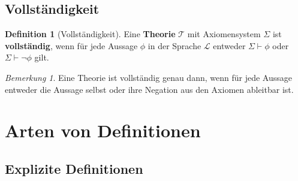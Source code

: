 \documentclass{book}
\theoremstyle{plain}
\theoremstyle{remark}
\newtheorem*{remark}{Bemerkung}
\theoremstyle{definition}
\newtheorem{definition}{Definition}[section]
\begin{document}
\subsection{Vollständigkeit}

\begin{definition}[Vollständigkeit]
Eine \textbf{Theorie} \(\mathcal{T}\) mit Axiomensystem \(\Sigma\) ist \textbf{vollständig}, wenn für jede Aussage \(\phi\) in der Sprache \(\mathcal{L}\) entweder \(\Sigma \vdash \phi\) oder \(\Sigma \vdash \neg \phi\) gilt.
\end{definition}

\begin{remark}
Eine Theorie ist vollständig genau dann, wenn für jede Aussage entweder die Aussage selbst oder ihre Negation aus den Axiomen ableitbar ist.
\end{remark}

\section{Arten von Definitionen}

\subsection{Explizite Definitionen}
\end{document}
